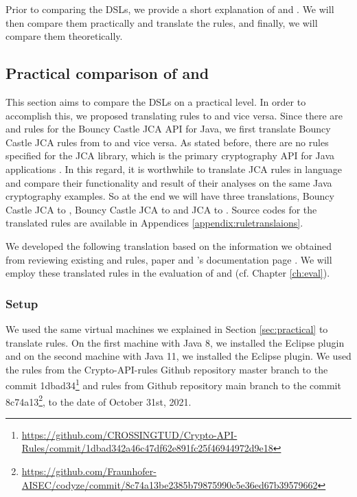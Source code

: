 Prior to comparing the DSLs, we provide a short explanation of \MARK{} and \crysl. We will then compare them practically and translate the rules, and finally, we will compare them theoretically.



 

\subsection{Practical comparison of \crysl{} and \MARK{}}
\label{sec:practicdsl}

This section aims to compare the DSLs on a practical level. In order to accomplish this, we proposed translating \crysl{} rules to \MARK{} and vice versa. Since there are \MARK{} and \crysl{} rules for the Bouncy Castle JCA API for Java, we first translate Bouncy Castle JCA rules from \crysl{} to \MARK{} and vice versa. As stated before, there are no \MARK{} rules specified for the JCA library, which is the primary cryptography API for Java applications \cite{snb16}. In this regard, it is worthwhile to translate \crysl{} JCA rules in \MARK{} language and compare their functionality and result of their analyses on the same Java cryptography examples. So at the end we will have three translations, \crysl{} Bouncy Castle JCA to \MARK, \MARK{} Bouncy Castle JCA to \crysl{} and \crysl{} JCA to \MARK. Source codes for the translated rules are available in Appendices \ref{appendix:ruletranslaions}.

We developed the following translation based on the information we obtained from reviewing existing \MARK{} and \crysl{} rules, \crysl{} paper \cite{skm19} and \codyze's documentation page \cite{cod}. We will employ these translated rules in the evaluation of \codyze{} and \cognicryptsast{} (cf. Chapter \ref{ch:eval}).



\subsubsection{Setup}
\label{sec:rulesetup}
We used the same virtual machines we explained in Section \ref{sec:practical} to translate rules. On the first machine with Java 8, we installed the \crysl{} Eclipse plugin and on the second machine with Java 11, we installed the \MARK{} Eclipse plugin. We used the \crysl{} rules from the Crypto-API-rules Github repository master branch \cite{apirules} to the commit 1dbad34\footnote{\url{https://github.com/CROSSINGTUD/Crypto-API-Rules/commit/1dbad342a46c47df62e891fc25f46944972d9e18}} and \MARK{} rules from \codyze{} Github repository main branch \cite{codyzegit} to the commit 8c74a13\footnote{\url{https://github.com/Fraunhofer-AISEC/codyze/commit/8c74a13be2385b79875990c5e36ed67b39579662}}, to the date of October 31st, 2021.

